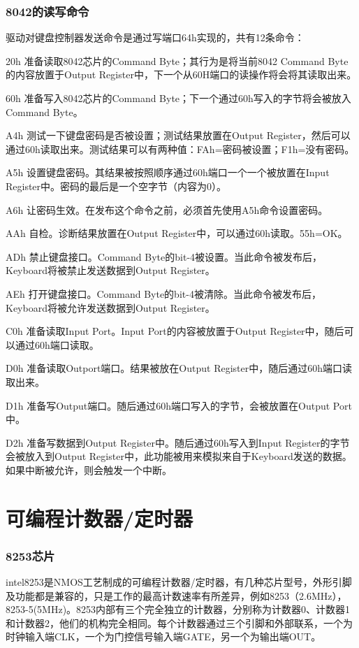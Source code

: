 \documentclass[12pt]{article}
\begin{document}
\section{8042的读写命令}
驱动对键盘控制器发送命令是通过写端口64h实现的，共有12条命令：
\begin{list}{•}{•}
\item 20h 准备读取8042芯片的Command Byte；其行为是将当前8042 Command Byte的内容放置于Output Register中，下一个从60H端口的读操作将会将其读取出来。
\item 60h 准备写入8042芯片的Command Byte；下一个通过60h写入的字节将会被放入Command Byte。
\item A4h 测试一下键盘密码是否被设置；测试结果放置在Output Register，然后可以通过60h读取出来。测试结果可以有两种值：FAh=密码被设置；F1h=没有密码。
\item A5h 设置键盘密码。其结果被按照顺序通过60h端口一个一个被放置在Input Register中。密码的最后是一个空字节（内容为0）。
\item A6h 让密码生效。在发布这个命令之前，必须首先使用A5h命令设置密码。
\item AAh 自检。诊断结果放置在Output Register中，可以通过60h读取。55h=OK。
\item ADh 禁止键盘接口。Command Byte的bit-4被设置。当此命令被发布后，Keyboard将被禁止发送数据到Output Register。
\item AEh 打开键盘接口。Command Byte的bit-4被清除。当此命令被发布后，Keyboard将被允许发送数据到Output Register。
\item C0h 准备读取Input Port。Input Port的内容被放置于Output Register中，随后可以通过60h端口读取。
\item D0h 准备读取Outport端口。结果被放在Output Register中，随后通过60h端口读取出来。
\item D1h 准备写Output端口。随后通过60h端口写入的字节，会被放置在Output Port中。
\item D2h 准备写数据到Output Register中。随后通过60h写入到Input Register的字节会被放入到Output Register中，此功能被用来模拟来自于Keyboard发送的数据。如果中断被允许，则会触发一个中断。

\part{可编程计数器/定时器}
\section{8253芯片}
intel8253是NMOS工艺制成的可编程计数器/定时器，有几种芯片型号，外形引脚及功能都是兼容的，只是工作的最高计数速率有所差异，例如8253（2.6MHz），8253-5(5MHz)。8253内部有三个完全独立的计数器，分别称为计数器0、计数器1和计数器2，他们的机构完全相同。每个计数器通过三个引脚和外部联系，一个为时钟输入端CLK，一个为门控信号输入端GATE，另一个为输出端OUT。


\end{list}
\end{document}
